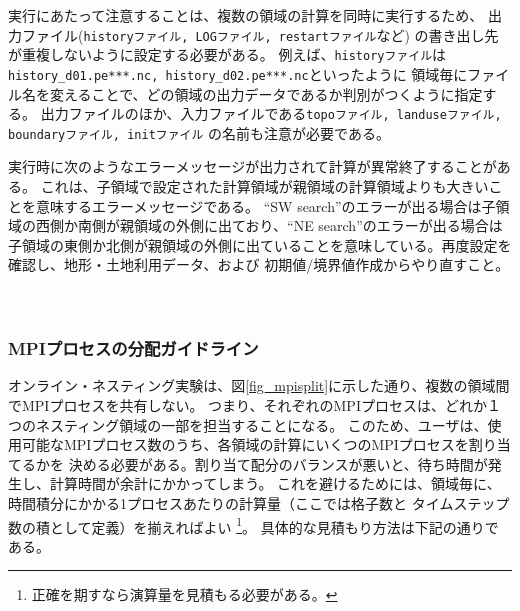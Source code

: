 実行にあたって注意することは、複数の領域の計算を同時に実行するため、
出力ファイル(\verb|historyファイル, LOGファイル, restartファイル|など) の書き出し先が重複しないように設定する必要がある。
例えば、\verb|historyファイル|は\verb|history_d01.pe***.nc, history_d02.pe***.nc|といったように
領域毎にファイル名を変えることで、どの領域の出力データであるか判別がつくように指定する。
出力ファイルのほか、入力ファイルである\verb|topoファイル, landuseファイル, boundaryファイル, initファイル|
の名前も注意が必要である。

実行時に次のようなエラーメッセージが出力されて計算が異常終了することがある。
これは、子領域で設定された計算領域が親領域の計算領域よりも大きいことを意味するエラーメッセージである。
``SW search''のエラーが出る場合は子領域の西側か南側が親領域の外側に出ており、``NE search''のエラーが出る場合は
子領域の東側か北側が親領域の外側に出ていることを意味している。再度設定を確認し、地形・土地利用データ、および
初期値/境界値作成からやり直すこと。\\


\\

\\



\subsubsection{MPIプロセスの分配ガイドライン}
オンライン・ネスティング実験は、図\ref{fig_mpisplit}に示した通り、複数の領域間でMPIプロセスを共有しない。
つまり、それぞれのMPIプロセスは、どれか１つのネスティング領域の一部を担当することになる。
このため、ユーザは、使用可能なMPIプロセス数のうち、各領域の計算にいくつのMPIプロセスを割り当てるかを
決める必要がある。割り当て配分のバランスが悪いと、待ち時間が発生し、計算時間が余計にかかってしまう。
これを避けるためには、領域毎に、時間積分にかかる1プロセスあたりの計算量（ここでは格子数と
タイムステップ数の積として定義）を揃えればよい
\footnote{正確を期すなら演算量を見積もる必要がある。}。
具体的な見積もり方法は下記の通りである。

